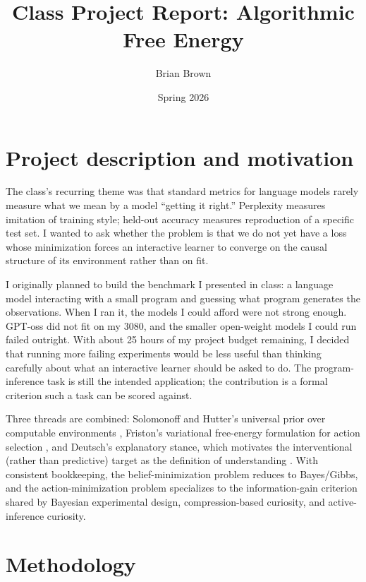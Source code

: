 \documentclass[11pt]{article}
\title{\vspace{-2.5em}Class Project Report: Algorithmic Free Energy}
\author{Brian Brown}
\date{Spring 2026}
\begin{document}
\maketitle
\vspace{-2.5em}

\section{Project description and motivation}

The class's recurring theme was that standard metrics for language models rarely measure what we mean by a model ``getting it right.'' Perplexity measures imitation of training style; held-out accuracy measures reproduction of a specific test set. I wanted to ask whether the problem is that we do not yet have a loss whose minimization forces an interactive learner to converge on the causal structure of its environment rather than on fit.

I originally planned to build the benchmark I presented in class: a language model interacting with a small program and guessing what program generates the observations. When I ran it, the models I could afford were not strong enough. GPT-oss did not fit on my 3080, and the smaller open-weight models I could run failed outright. With about 25 hours of my project budget remaining, I decided that running more failing experiments would be less useful than thinking carefully about what an interactive learner should be asked to do. The program-inference task is still the intended application; the contribution is a formal criterion such a task can be scored against.

Three threads are combined: Solomonoff and Hutter's universal prior over computable environments \citep{Solomonoff1964a,Hutter2005}, Friston's variational free-energy formulation for action selection \citep{Friston2010}, and Deutsch's explanatory stance, which motivates the interventional (rather than predictive) target as the definition of understanding \citep{Deutsch2011}. With consistent bookkeeping, the belief-minimization problem reduces to Bayes/Gibbs, and the action-minimization problem specializes to the information-gain criterion shared by Bayesian experimental design, compression-based curiosity, and active-inference curiosity.

\section{Methodology}
\end{document}
